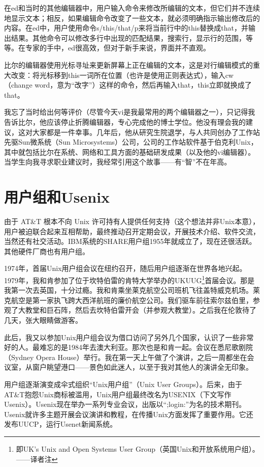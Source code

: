 \documentclass[a4paper,12pt,UTF8,twoside]{ctexbook}
\begin{document}
在ed和当时的其他编辑器中，用户输入命令来修改所编辑的文本，但它们并不连续地显示文本；相反，如果编辑命令改变了一些文本，就必须明确指示输出修改后的内容。在ed中，用户使用命令s/this/that/p来将当前行中的this替换成that，并输出结果。其他命令可以修改多行中出现的匹配结果，搜索行，显示行的范围，等等。在专家的手中，ed很高效，但对于新手来说，界面并不直观。

比尔的编辑器使用光标寻址来更新屏幕上正在编辑的文本，这是对行编辑模式的重大改变：将光标移到this一词所在位置（也许是使用正则表达式），输入cw（change word，意为“改字”）这样的命令，然后再输入that，this立即就换成了that。

我忘了当时给出何等评价（尽管今天vi是我最常用的两个编辑器之一），只记得我告诉比尔，他应该停止折腾编辑器，专心完成他的博士学位。他没有理会我的建议，这对大家都是一件幸事。几年后，他从研究生院退学，与人共同创办了工作站先驱Sun微系统（Sun Microsystems）公司，公司的工作站软件基于伯克利Unix，其中就包括比尔在系统、网络和工具方面的基础研发成果（以及他的vi编辑器）。当学生向我寻求职业建议时，我经常引用这个故事——有“智”不在年高。

\section{用户组和Usenix}

由于 AT\&T 根本不向 Unix 许可持有人提供任何支持（这个想法并非Unix本意），用户被迫联合起来互相帮助，最终推动召开定期会议，开展技术介绍、软件交流，当然还有社交活动。IBM系统的SHARE用户组1955年就成立了，现在还很活跃。其他硬件厂商也有用户组。

1974年，首届Unix用户组会议在纽约召开，随后用户组逐渐在世界各地兴起。1979年，我和肯参加了位于坎特伯雷的肯特大学举办的UKUUG\footnote{即UK’s Unix and Open Systems User Group（英国Unix和开放系统用户组）。——译者注}首届会议。那是我第一次去英国，十分过瘾。我和肯乘坐莱克航空公司班机飞往盖特威克机场。莱克航空是第一家执飞跨大西洋航班的廉价航空公司。我们驱车前往索尔兹伯里，参观了大教堂和巨石阵，然后去坎特伯雷开会（并参观大教堂）。之后我在伦敦待了几天，张大眼睛做游客。

此后，我又以参加Unix用户组会议为借口访问了另外几个国家，认识了一些非常好的人。最难忘的是1984年去澳大利亚。那次也是和肯一起。会议在悉尼歌剧院（Sydney Opera House）举行。我在第一天上午做了个演讲，之后一周都坐在会议室，从窗户眺望港口——景色如此迷人，以至于我对其他人的演讲全无印象。

用户组逐渐演变成伞式组织“Unix用户组”（Unix User Groups）。后来，由于AT\&T抱怨Unix商标被滥用，Unix用户组最终改名为USENIX（下文写作Usenix）。Usenix现在举办一系列专业会议，出版以“;login:”为名的技术期刊。Usenix就许多主题开展会议演讲和教程，在传播Unix方面发挥了重要作用。它还发布UUCP，运行Usenet新闻系统。
\end{document}
